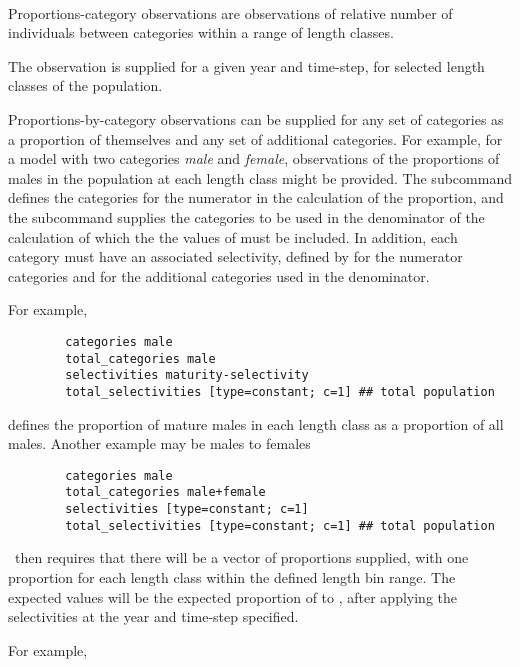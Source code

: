 \paragraph*{}\label{sec:Observation-ProportionsMatureByLength}
Proportions-category observations are observations of relative number of individuals between categories within a range of length classes.

The observation is supplied for a given year and time-step, for selected length classes of the population.


Proportions-by-category observations can be supplied for any set of categories as a proportion of themselves and any set of additional categories. For example, for a model with two categories \emph{male} and \emph{female}, observations of the proportions of males in the population at each length class might be provided. The subcommand  defines the categories for the numerator in the calculation of the proportion, and the subcommand  supplies the categories to be used in the denominator of the calculation of which the the values of  must be included. In addition, each category must have an associated selectivity, defined by  for the numerator categories and  for the additional categories used in the denominator.

For example,

{\small{\begin{verbatim}
		categories male
		total_categories male
		selectivities maturity-selectivity
		total_selectivities [type=constant; c=1] ## total population
		\end{verbatim}}}
defines the proportion of mature males in each length class as a proportion of all males. Another example may be males to females
{\small{\begin{verbatim}
		categories male
		total_categories male+female
		selectivities [type=constant; c=1]
		total_selectivities [type=constant; c=1] ## total population
		\end{verbatim}}}
\CNAME\ then requires that there will be a vector of proportions supplied, with one proportion for each length class within the defined length bin range. The expected values will be the expected proportion of  to , after applying the selectivities at the year and time-step specified.

For example,


